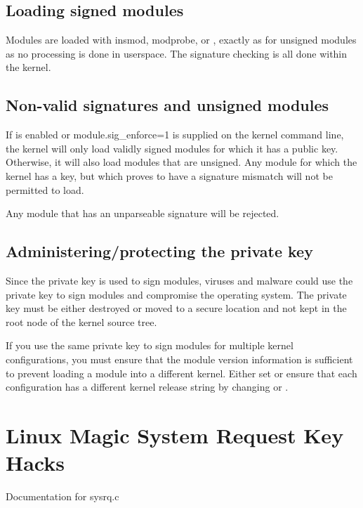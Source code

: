 \documentclass[a4paper,8pt,english]{sphinxmanual}
\begin{document}
\section{Loading signed modules}
\label{admin-guide/module-signing:loading-signed-modules}
Modules are loaded with insmod, modprobe,  or
, exactly as for unsigned modules as no processing is
done in userspace.  The signature checking is all done within the kernel.


\section{Non-valid signatures and unsigned modules}
\label{admin-guide/module-signing:non-valid-signatures-and-unsigned-modules}
If  is enabled or module.sig\_enforce=1 is supplied on
the kernel command line, the kernel will only load validly signed modules
for which it has a public key.   Otherwise, it will also load modules that are
unsigned.   Any module for which the kernel has a key, but which proves to have
a signature mismatch will not be permitted to load.

Any module that has an unparseable signature will be rejected.


\section{Administering/protecting the private key}
\label{admin-guide/module-signing:administering-protecting-the-private-key}
Since the private key is used to sign modules, viruses and malware could use
the private key to sign modules and compromise the operating system.  The
private key must be either destroyed or moved to a secure location and not kept
in the root node of the kernel source tree.

If you use the same private key to sign modules for multiple kernel
configurations, you must ensure that the module version information is
sufficient to prevent loading a module into a different kernel.  Either
set  or ensure that each configuration has a different
kernel release string by changing  or .


\chapter{Linux Magic System Request Key Hacks}
\label{admin-guide/sysrq::doc}\label{admin-guide/sysrq:linux-magic-system-request-key-hacks}
Documentation for sysrq.c
\end{document}
